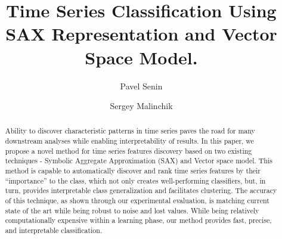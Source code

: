 \documentclass{llncs}
\begin{document}
%
\mainmatter              %
%
\title{Time Series Classification Using SAX Representation and Vector Space Model.}
%
%
\author{Pavel Senin
\and Sergey Malinchik
}
%
%
%


\maketitle              %

\begin{abstract}
Ability to discover characteristic patterns in time series paves the road for many
downstream analyses while enabling interpretability of results. 
In this paper, we propose a novel method for time series features discovery based on two existing
techniques - Symbolic Aggregate Approximation (SAX) and Vector space model. 
This method is capable to automatically discover and rank time series features by their
“importance” to the class, which not only creates well-performing classifiers, but, in turn,
provides interpretable class generalization and facilitates clustering. The accuracy of this
technique, as shown  through our experimental evaluation, is matching current state of the art while
being robust to noise and lost values.  
While being relatively computationally expensive within a learning phase, our method provides fast,
precise, and interpretable classification.
\end{abstract}
%
\end{document}
